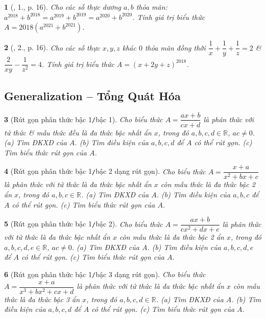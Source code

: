 \documentclass{article}
\newtheorem{baitoan}{}
\begin{document}
\begin{baitoan}[\cite{Lam_An_Tuan_Toan_9_dai_so}, 1., p. 16]
	Cho các số thực dương $a,b$ thỏa mãn: $a^{2018} + b^{2018} = a^{2019} + b^{2019} = a^{2020} + b^{2020}$. Tính giá trị biểu thức $A = 2018(a^{2021} + b^{2021})$.
\end{baitoan}

\begin{baitoan}[\cite{Lam_An_Tuan_Toan_9_dai_so}, 2., p. 16]
	Cho các số thực $x,y,z$ khác $0$ thỏa mãn đồng thời $\dfrac{1}{x} + \dfrac{1}{y} + \dfrac{1}{z} = 2$ \& $\dfrac{2}{xy} - \dfrac{1}{z^2} = 4$. Tính giá trị biểu thức $A = (x + 2y + z)^{2018}$.
\end{baitoan}


\subsection{Generalization -- Tổng Quát Hóa}

\begin{baitoan}[Rút gọn phân thức bậc 1{\tt/}bậc 1]
	Cho biểu thức $A = \dfrac{ax + b}{cx + d}$ là phân thức với tử thức \& mẫu thức đều là đa thức bậc nhất ẩn $x$, trong đó $a,b,c,d\in\mathbb{R}$, $ac\ne0$. (a) Tìm {\rm ĐKXĐ} của $A$. (b) Tìm điều kiện của $a,b,c,d$ để $A$ có thể rút gọn. (c) Tìm  biểu thức rút gọn của $A$.
\end{baitoan}

\begin{baitoan}[Rút gọn phân thức bậc 1{\tt/}bậc 2 dạng rút gọn]
	Cho biểu thức $A = \dfrac{x + a}{x^2 + bx + c}$ là phân thức với tử thức là đa thức bậc nhất ẩn $x$ còn mẫu thức là đa thức bậc 2 ẩn $x$, trong đó $a,b,c\in\mathbb{R}$. (a) Tìm {\rm ĐKXĐ} của $A$. (b) Tìm điều kiện của $a,b,c$ để $A$ có thể rút gọn. (c) Tìm biểu thức rút gọn của $A$.
\end{baitoan}

\begin{baitoan}[Rút gọn phân thức bậc 1{\tt/}bậc 2]
	Cho biểu thức $A = \dfrac{ax + b}{cx^2 + dx + e}$ là phân thức với tử thức là đa thức bậc nhất ẩn $x$ còn mẫu thức là đa thức bậc 2 ẩn $x$, trong đó $a,b,c,d,e\in\mathbb{R}$, $ac\ne0$. (a) Tìm {\rm ĐKXĐ} của $A$. (b) Tìm điều kiện của $a,b,c,d,e$ để $A$ có thể rút gọn. (c) Tìm biểu thức rút gọn của $A$.
\end{baitoan}

\begin{baitoan}[Rút gọn phân thức bậc 1{\tt/}bậc 3 dạng rút gọn]
	Cho biểu thức $A = \dfrac{x + a}{x^3 + bx^2 + cx + d}$ là phân thức với tử thức là đa thức bậc nhất ẩn $x$ còn mẫu thức là đa thức bậc 3 ẩn $x$, trong đó $a,b,c,d\in\mathbb{R}$. (a) Tìm {\rm ĐKXĐ} của $A$. (b) Tìm điều kiện của $a,b,c,d$ để $A$ có thể rút gọn. (c) Tìm biểu thức rút gọn của $A$.
\end{baitoan}
\end{document}
